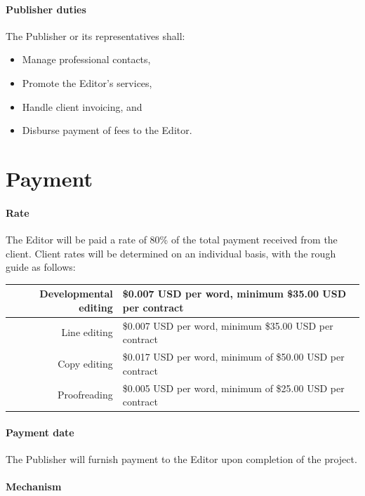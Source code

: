 \documentclass[12pt,letterpaper,oneside]{article}
\begin{document}
\paragraph{Publisher duties}

The Publisher or its representatives shall:

\begin{itemize}
    \item Manage professional contacts,
    \item Promote the Editor's services,
    \item Handle client invoicing, and
    \item Disburse payment of fees to the Editor.
\end{itemize}

\section{Payment}

\paragraph{Rate}

The Editor will be paid a rate of 80\% of the total payment received from the client. Client rates will be determined on an individual basis, with the rough guide as follows:

\begin{tabular}{| r | l |}
  \hline
  Developmental editing & \$0.007 USD per word, minimum \$35.00 USD per contract \\
  \hline
  Line editing & \$0.007 USD per word, minimum \$35.00 USD per contract \\
  \hline
  Copy editing & \$0.017 USD per word, minimum of \$50.00 USD per contract \\
  \hline
  Proofreading & \$0.005 USD per word, minimum of \$25.00 USD per contract \\
  \hline
\end{tabular}

\paragraph{Payment date}

The Publisher will furnish payment to the Editor upon completion of the project.

\paragraph{Mechanism}
\end{document}
